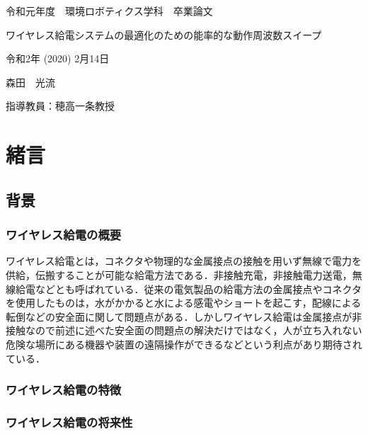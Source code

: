 \documentclass[12pt]{jarticle}
\begin{document}
	
\thispagestyle{empty}

\vspace*{20mm}
\begin{center}
	{\Large 令和元年度　環境ロボティクス学科　卒業論文}
\end{center}
\vspace{10mm}
\begin{center}
	{\Huge ワイヤレス給電システムの最適化のための能率的な動作周波数スイープ}
\end{center}
\vspace{90mm}
\begin{center}
	{\Large 令和2年 (2020) 2月14日}
\end{center}
\begin{center}
	{\Large 森田　光流}
\end{center}
\begin{center}
	{\Large 指導教員：穂高一条教授}
\end{center}

\clearpage

\tableofcontents

\clearpage

\section{緒言}
\subsection{背景}
\subsubsection{ワイヤレス給電の概要}
ワイヤレス給電とは，コネクタや物理的な金属接点の接触を用いず無線で電力を供給，伝搬することが可能な給電方法である．非接触充電，非接触電力送電，無線給電などとも呼ばれている．従来の電気製品の給電方法の金属接点やコネクタを使用したものは，水がかかると水による感電やショートを起こす，配線による転倒などの安全面に関して問題点がある．しかしワイヤレス給電は金属接点が非接触なので前述に述べた安全面の問題点の解決だけではなく，人が立ち入れない危険な場所にある機器や装置の遠隔操作ができるなどという利点があり期待されている．
\subsubsection{ワイヤレス給電の特徴}
\subsubsection{ワイヤレス給電の将来性}
\end{document}
